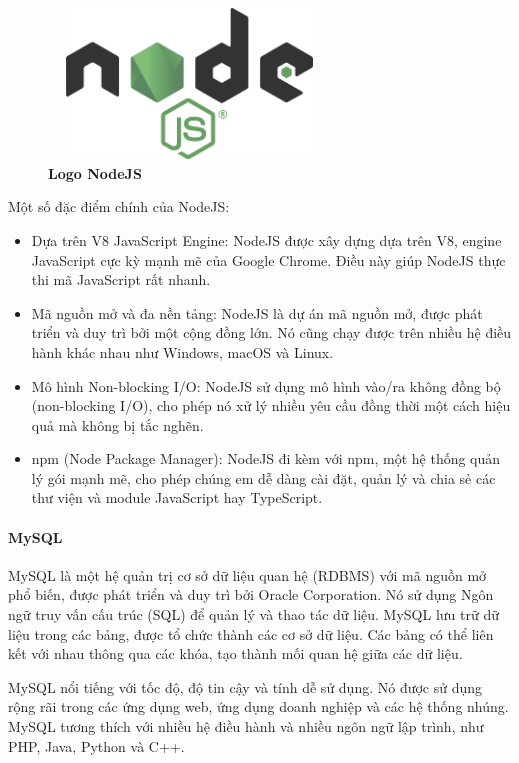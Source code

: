 \begin{figure}[H]
	\centering
	\includegraphics[width=7.5cm,height=4cm]{Images/Technology/nodejs.png}
	\caption[Logo NodeJS]{\bfseries \fontsize{12pt}{0pt}
		\selectfont Logo NodeJS}
	\label{nodejs} %
\end{figure}

Một số đặc điểm chính của NodeJS:
\begin{itemize}
	\item Dựa trên V8 JavaScript Engine: NodeJS được xây dựng dựa trên V8, engine JavaScript cực kỳ mạnh mẽ của Google Chrome. Điều này giúp NodeJS thực thi mã JavaScript rất nhanh.
	\item Mã nguồn mở và đa nền tảng: NodeJS là dự án mã nguồn mở, được phát triển và duy trì bởi một cộng đồng lớn. Nó cũng chạy được trên nhiều hệ điều hành khác nhau như Windows, macOS và Linux.
	\item Mô hình Non-blocking I/O: NodeJS sử dụng mô hình vào/ra không đồng bộ (non-blocking I/O), cho phép nó xử lý nhiều yêu cầu đồng thời một cách hiệu quả mà không bị tắc nghẽn.
	\item npm (Node Package Manager): NodeJS đi kèm với npm, một hệ thống quản lý gói mạnh mẽ, cho phép chúng em dễ dàng cài đặt, quản lý và chia sẻ các thư viện và module JavaScript hay TypeScript.
\end{itemize}

\paragraph{MySQL}
\mbox{}

MySQL là một hệ quản trị cơ sở dữ liệu quan hệ (RDBMS) với mã nguồn mở phổ biến, được phát triển và duy trì bởi Oracle Corporation. Nó sử dụng Ngôn ngữ truy vấn cấu trúc (SQL) để quản lý và thao tác dữ liệu. MySQL lưu trữ dữ liệu trong các bảng, được tổ chức thành các cơ sở dữ liệu. Các bảng có thể liên kết với nhau thông qua các khóa, tạo thành mối quan hệ giữa các dữ liệu.

MySQL nổi tiếng với tốc độ, độ tin cậy và tính dễ sử dụng. Nó được sử dụng rộng rãi trong các ứng dụng web, ứng dụng doanh nghiệp và các hệ thống nhúng. MySQL tương thích với nhiều hệ điều hành và nhiều ngôn ngữ lập trình, như PHP, Java, Python và C++.


